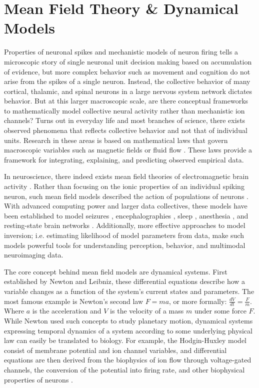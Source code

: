 \section{Mean Field Theory \& Dynamical Models}
Properties of neuronal spikes and mechanistic models of neuron firing tells a microscopic story of single neuronal unit decision making based on accumulation of evidence, but more complex behavior such as movement and cognition do not arise from the spikes of a single neuron. Instead, the collective behavior of many cortical, thalamic, and spinal neurons in a large nervous system network dictates behavior. But at this larger macroscopic scale, are there conceptual frameworks to mathematically model collective neural activity rather than mechanistic ion channels? Turns out in everyday life and most branches of science, there exists observed phenomena that reflects collective behavior and not that of individual units. Research in these areas is based on mathematical laws that govern macroscopic variables such as magnetic fields or fluid flow \cite{haken_introduction_2004,fiedler_coherent_1987}. These laws provide a framework for integrating, explaining, and predicting observed empirical data.

In neuroscience, there indeed exists mean field theories of electromagnetic brain activity \cite{PhysRevLett.77.960}. Rather than focusing on the ionic properties of an individual spiking neuron, such mean field models described the action of populations of neurons \cite{freeman_mass_1975}. With advanced computing power and larger data collectives, these models have been established to model seizures \cite{breakspear2006unifying}, encephalographies \cite{bojak2015emergence}, sleep \cite{phillips2007quantitative}, anesthesia \cite{bojak2005modeling}, and resting-state brain networks \cite{Honey2007,Deco2009}. Additionally, more effective approaches to model inversion; i.e. estimating likelihood of model parameters from data, make such models powerful tools for understanding perception, behavior, and multimodal neuroimaging data. 

The core concept behind mean field models are dynamical systems. First established by Newton and Leibniz, these differential equations describe how a variable changes as a function of the system's current states and parameters. The most famous example is Newton's second law $F = ma$, or more formally: $\frac{dV}{dt} = \frac{F}{m}$. Where $a$ is the acceleration and $V$ is the velocity of a mass $m$ under some force $F$. While Newton used such concepts to study planetary motion, dynamical systems expressing temporal dynamics of a system according to some underlying physical law can easily be translated to biology. For example, the Hodgin-Huxley model consist of membrane potential and ion channel variables, and differential equations are then derived from the biophysics of ion flow through voltage-gated channels, the conversion of the potential into firing rate, and other biophysical properties of neurons \cite{hodgkin_quantitative_1952,Wilson1972}. 

